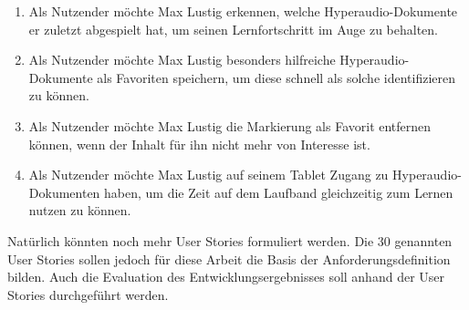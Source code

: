 \begin{enumerate}[label=US-\arabic*:,ref=US-\arabic*]
\item \label{US-Uebersicht-Letzte} Als Nutzender möchte Max Lustig erkennen, welche Hyperaudio-Dokumente er zuletzt abgespielt hat, um seinen Lernfortschritt im Auge zu behalten.

\item \label{US-Favoriten} Als Nutzender möchte Max Lustig besonders hilfreiche Hyperaudio-Dokumente als Favoriten speichern, um diese schnell als solche identifizieren zu können.

\item \label{US-Favoriten-Loeschen} Als Nutzender möchte Max Lustig die Markierung als Favorit entfernen können, wenn der Inhalt für ihn nicht mehr von Interesse ist.

\item \label{US-Zeit-Mobil} Als Nutzender möchte Max Lustig auf seinem Tablet Zugang zu Hyperaudio-Dokumenten haben, um die Zeit auf dem Laufband gleichzeitig zum Lernen nutzen zu können.

\end{enumerate}

Natürlich könnten noch mehr User Stories formuliert werden. Die 30 genannten User Stories sollen jedoch für diese Arbeit die Basis der Anforderungsdefinition bilden. Auch die Evaluation des Entwicklungsergebnisses soll anhand der User Stories durchgeführt werden.

%
%
%
%


